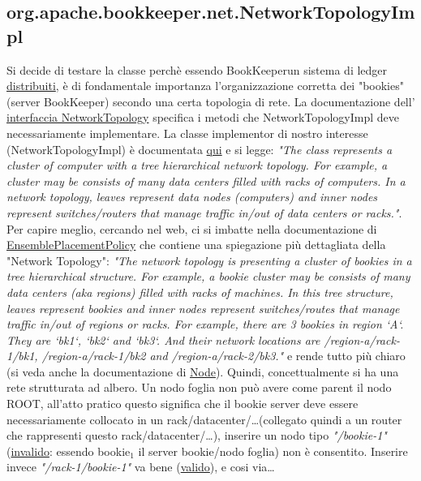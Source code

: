 \documentclass[10pt, a4paper]{article}
\def\bookkeeper{BookKeeper}
\begin{document}
	\subsection{org.apache.bookkeeper.net.NetworkTopologyImpl}
	Si decide di testare la classe perchè essendo \bookkeeper un sistema di ledger \underline{distribuiti}, è di fondamentale importanza l'organizzazione
	corretta dei "bookies" (server \bookkeeper) secondo una certa topologia di rete. La documentazione dell'
	\href{https://bookkeeper.apache.org/docs/latest/api/javadoc/org/apache/bookkeeper/net/NetworkTopology.html}{interfaccia NetworkTopology} specifica i
	metodi che NetworkTopologyImpl deve necessariamente implementare. La classe implementor di nostro interesse (NetworkTopologyImpl) è documentata 
	\href{https://bookkeeper.apache.org/docs/latest/api/javadoc/org/apache/bookkeeper/net/NetworkTopologyImpl.html}{qui} e si legge:
	\textit{"The class represents a cluster of computer with a tree hierarchical network topology. 
	For example, a cluster may be consists of many data centers filled with racks of computers. In a network topology, 
	leaves represent data nodes (computers) and inner nodes represent switches/routers that manage traffic in/out of data centers or racks."}.
	Per capire meglio, cercando nel web, ci si imbatte nella documentazione di 
	\href{https://bookkeeper.apache.org/docs/latest/api/javadoc/org/apache/bookkeeper/client/EnsemblePlacementPolicy.html}{EnsemblePlacementPolicy} 
	che contiene una spiegazione più dettagliata della "Network Topology": 
	\textit{"The network topology is presenting a cluster of bookies in a tree hierarchical structure. 
	For example, a bookie cluster may be consists of many data centers (aka regions) filled with racks of machines. 
	In this tree structure, leaves represent bookies and inner nodes represent switches/routes that manage traffic in/out of regions or racks.
	For example, there are 3 bookies in region `A`. They are `bk1`, `bk2` and `bk3`. And their network locations are /region-a/rack-1/bk1, 
	/region-a/rack-1/bk2 and /region-a/rack-2/bk3."} e rende tutto più chiaro (si veda anche la documentazione di \href{https://bookkeeper.apache.org/docs/latest/api/javadoc/org/apache/bookkeeper/net/Node.html}{Node}).
	Quindi, concettualmente si ha una rete strutturata ad albero.
	Un nodo foglia non può avere come parent il nodo ROOT, all'atto pratico questo significa che il bookie server deve essere necessariamente
	collocato in un rack/datacenter/\dots (collegato quindi a un router che rappresenti questo rack/datacenter/\dots), inserire un nodo tipo
	\textit{"/bookie-1"} (\underline{invalido}: essendo bookie$_1$ il server bookie/nodo foglia) non è consentito. 
	Inserire invece \textit{"/rack-1/bookie-1"} va bene (\underline{valido}), e cosi via\dots 
\end{document}
